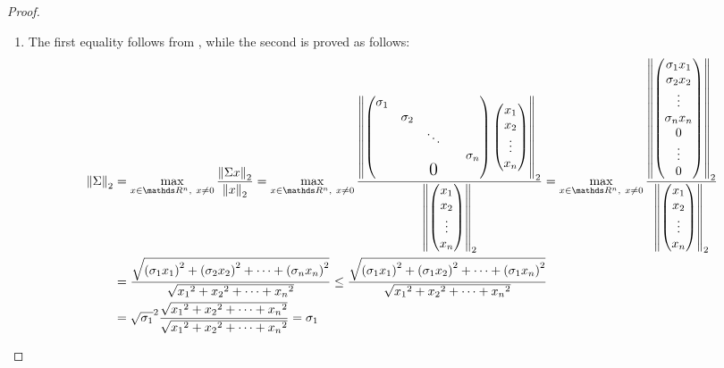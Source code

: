 \documentclass[ComputationalMathematics.tex]{subfiles}
\begin{document}
\begin{proof}~\\
  \begin{enumerate}
    \item The first equality follows from , while the second is proved as follows:
  \begin{equation}
    \begin{split}
      \norm{\Sigma}_2 &=
    \max\limits_{x \in \R^n,~x \neq 0}\frac{\norm{\Sigma x}_2}{\norm{x}_2} =
    \max\limits_{x \in \R^n,~x \neq 0}\frac{\norm{\begin{pmatrix}
    \sigma_1\\
    & \sigma_2\\
    && \ddots\\
    &&&& \sigma_n\\
      &&\text{\Large 0}&&\\
    \end{pmatrix} 
    \begin{pmatrix}
      x_1\\
      x_2\\
      \vdots\\
      x_n\\
    \end{pmatrix}}_2}
      {\norm{\begin{pmatrix}
      x_1\\
      x_2\\
      \vdots\\
      x_n\\
    \end{pmatrix}}_2}
    =
      \max\limits_{x \in \R^n,~x \neq 0}\frac{\norm{\begin{pmatrix}
      \sigma_1 x_1\\
      \sigma_2 x_2\\
      \vdots\\
      \sigma_n x_n\\
      0\\
      \vdots\\
      0\\
      \end{pmatrix}}_2}
      {\norm{\begin{pmatrix}
      x_1\\
      x_2\\
      \vdots\\
      x_n\\
      \end{pmatrix}}_2}\\
      &=
    \frac{\sqrt{{(\sigma_1 x_1)}^2 + {(\sigma_2 x_2)}^2 + \cdots +{(\sigma_n x_n)}^2}}{\sqrt{{x_1}^2 + {x_2}^2 + \cdots +{x_n}^2}}
      \le 
      \frac{\sqrt{{(\sigma_1 x_1)}^2 + {(\sigma_1 x_2)}^2 + \cdots +{(\sigma_1 x_n)}^2}}{\sqrt{{x_1}^2 + {x_2}^2 + \cdots +{x_n}^2}}\\
      &=
    \sqrt{\sigma_1}^2 \frac{\sqrt{{x_1}^2 + {x_2}^2 + \cdots +{x_n}^2}}{\sqrt{{x_1}^2 + {x_2}^2 + \cdots +{x_n}^2}}
      = \sigma_1
  \end{split}
  \end{equation}


\end{enumerate}
\end{proof}
\end{document}
